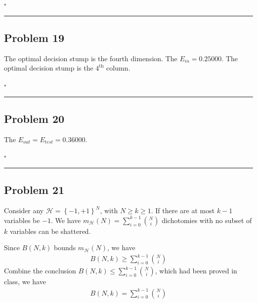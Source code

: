 \documentclass[12pt]{article}
\newcommand*{\QEDB}{\hfill\ensuremath{\square}}
\newcommand{\CBrackets}[1]{\left\{#1\right\}}
\newcommand{\ParTh}[1]{\left(#1\right)}
\newcommand{\horrule}[1]{\rule{\linewidth}{#1}}
\begin{document}
\QEDB

\horrule{0.5pt}

\subsection*{Problem 19}

The optimal decision stump is the fourth dimension. The $E_{in}=0.25000$. The optimal decision stump is the $4^{\text{th}}$ column.

\QEDB

\horrule{0.5pt}

\subsection*{Problem 20}

The $E_{out}=E_{test}=0.36000$.

\QEDB

\horrule{0.5pt}

\subsection*{Problem 21}

Consider any $\mathcal{H}=\CBrackets{-1,+1}^N$, with $N\geq k\geq 1$. If there are at most $k-1$ variables be $-1$. We have $m_{\mathcal{H}}\ParTh{N}=\sum_{i=0}^{k-1}\binom{N}{i}$ dichotomies with no subset of $k$ variables can be shattered.

Since $B\ParTh{N,k}$ bounds $m_{\mathcal{H}}\ParTh{N}$, we have
\begin{align}
B\ParTh{N,k}\geq\sum_{i=0}^{k-1}\binom{N}{i}
\end{align}
Combine the conclusion $B\ParTh{N,k}\leq\sum_{i=0}^{k-1}\binom{N}{i}$, which had been proved in class, we have
\begin{align}
B\ParTh{N,k}=\sum_{i=0}^{k-1}\binom{N}{i}
\end{align}
\end{document}
